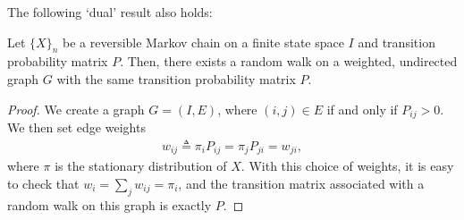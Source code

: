 \documentclass[a4paper,10pt,english]{article}
\begin{document}
%
%

The following `dual' result also holds:

\begin{lem} 
Let $\{X\}_n$ be a reversible Markov chain on a finite state space $I$ and transition probability matrix $P$. Then, there exists a random walk on a weighted, undirected graph $G$ with the same transition probability matrix $P$. 
\end{lem}
\begin{proof} 
We create a graph $G = (I,E)$, where $(i,j) \in E$ if and only if $P_{ij} > 0$. We then set edge weights 
\begin{align*}
w_{ij} \triangleq \pi_i P_{ij} = \pi_jP_{ji} = w_{ji},
\end{align*}
where $\pi$ is the stationary distribution of $X$. With this choice of weights, it is easy to check that $w_i = \sum_j w_{ij} = \pi_i$, and the transition matrix associated with a random walk on this graph is exactly $P$.
\end{proof}
\end{document}
